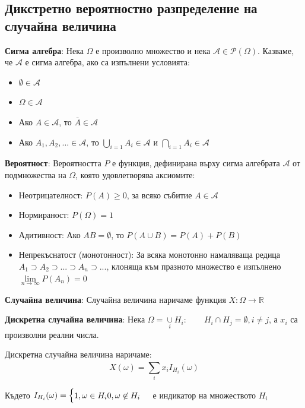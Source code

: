 \documentclass{article}
\renewcommand{\\}{\newline}
\begin{document}
\subsection{Дикстретно вероятностно разпределение на случайна величина}

\textbf{Сигма алгебра}: Нека \(\Omega\) е произволно множество и нека \(\mathcal{A} \in \mathcal{P}(\Omega)\). Казваме, че  \(\mathcal{A}\) е сигма алгебра, ако са изпълнени условията: \begin{itemize}
    \item \(\emptyset \in \mathcal{A}\) 
    \item \(\Omega \in \mathcal{A}\) 
    \item Ако \(A \in \mathcal{A}\), то \(\bar{A} \in \mathcal{A}\) 
    \item Ако \(A_1, A_2,... \in \mathcal{A}\), то \(\bigcup_{i=1}A_i \in \mathcal{A}\) и \(\bigcap_{i=1}A_i \in \mathcal{A}\)    
\end{itemize}   

\textbf{Вероятност}: Вероятността \(P\) е функция, дефинирана върху сигма алгебрата \(\mathcal{A}\) от подмножества на \(\Omega\), която удовлетворява аксиомите:      

\begin{itemize}
    \item Неотрицателност: \(P(A) \geq 0\), за всяко събитие \(A \in \mathcal{A}\) 
    \item Нормираност: \(P(\Omega) = 1\) 
    \item Адитивност: Ако \(AB = \emptyset\), то \(P(A\cup B) = P(A) + P(B)\) 
    \item Непрекъснатост (монотонност): За всяка монотонно намаляваща редица \(A_1 \supset A_2 \supset ... \supset A_n \supset ...\), клоняща към празното множество е изпълнено \(\underset{n\to \infty}{\lim}P(A_n) = 0\)   
\end{itemize}

\textbf{Случайна величина}: Случайна величина наричаме функция \(X: \Omega \to \mathbb{R}\)  

\textbf{Дискретна случайна величина}: Нека \(\Omega = \underset{i}{\cup}H_{i}:\qquad H_{i} \cap H_{j} = \emptyset, i \not=j\), а \(x_i\) са произволни реални числа.  

Дискретна случайна величина наричаме: \[
  X(\omega) = \sum_{i}^{}x_iI_{H_i}(\omega)
\] 

Където \(I_{H_i}(\omega) = \begin{cases} 1, \omega \in H_{i} \\ 0, \omega \not\in H_{i}\end{cases}\) е индикатор на множеството \(H_{i}\) 
\end{document}
